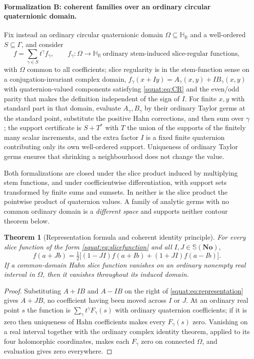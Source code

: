 \documentclass[11pt,letterpaper]{article}
\numberwithin{equation}{section}
\newtheorem{theorem}{Theorem}[section]
\theoremstyle{definition}
\theoremstyle{remark}
\newcommand{\No}{\mathbf{No}}
\newcommand{\HR}{\mathbb H_{\mathbb R}}
\begin{document}
\paragraph{Formalization B: coherent families over an ordinary circular quaternionic domain.}
Fix instead an ordinary circular quaternionic domain $\Omega\subseteq\HR$ and a
well-ordered $S\subseteq\Gamma$, and consider
\begin{equation}\label{squat:eq:coherent}
 f=\sum_{\gamma\in S}t^\gamma f_\gamma,\qquad
 f_\gamma:\Omega\to\HR\ \text{ordinary stem-induced slice-regular functions},
\end{equation}
with $\Omega$ common to all coefficients; slice regularity is in the stem-function sense on
a conjugation-invariant complex domain, $f_\gamma(x+Iy)=A_\gamma(x,y)+IB_\gamma(x,y)$ with
quaternion-valued components satisfying \cref{squat:eq:CR} and the even/odd parity that
makes the definition independent of the sign of $I$. For finite $x,y$ with standard part in
that domain, evaluate $A_\gamma,B_\gamma$ by their ordinary Taylor germs at the standard
point, substitute the positive Hahn corrections, and then sum over $\gamma$; the support
certificate is $S+T^*$ with $T$ the union of the supports of the finitely many scalar
increments, and the extra factor $I$ is a fixed finite quaternion contributing only its own
well-ordered support. Uniqueness of ordinary Taylor germs ensures that shrinking a
neighbourhood does not change the value.

Both formalizations are closed under the slice product induced by multiplying stem
functions, and under coefficientwise differentiation, with support sets transformed by
finite sums and sumsets. In neither is the slice product the pointwise product of
quaternion values. A family of analytic germs with no common ordinary domain is a
\emph{different space} and supports neither contour theorem below.

\begin{theorem}[Representation formula and coherent identity principle]
\label{squat:thm:representation}
For every slice function of the form \cref{squat:eq:slicefunction} and all
$I,J\in\mathbb S(\No)$,
\begin{equation}\label{squat:eq:representation}
 f(a+Jb)=\tfrac12\bigl[(1-JI)f(a+Ib)+(1+JI)f(a-Ib)\bigr].
\end{equation}
If a common-domain Hahn slice function vanishes on an ordinary nonempty real interval in
$\Omega$, then it vanishes throughout its induced domain.
\end{theorem}
\begin{proof}
Substituting $A+IB$ and $A-IB$ on the right of \cref{squat:eq:representation} gives
$A+JB$, no coefficient having been moved across $I$ or $J$. At an ordinary real point $s$
the function is $\sum_\gamma t^\gamma F_\gamma(s)$ with ordinary quaternion coefficients;
if it is zero then uniqueness of Hahn coefficients makes every $F_\gamma(s)$ zero.
Vanishing on a real interval together with the ordinary complex identity theorem, applied
to its four holomorphic coordinates, makes each $F_\gamma$ zero on connected $\Omega$, and
evaluation gives zero everywhere.
\end{proof}
\end{document}

